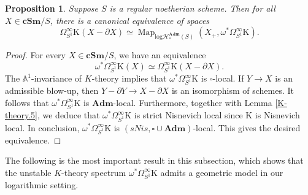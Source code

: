 \documentclass[11pt, a4paper]{amsart}
\newtheorem{prop}[thm]{Proposition}
\theoremstyle{definition}
\numberwithin{equation}{subsection}
\newcommand{\A}{\mathbb{A}}
\newcommand{\cSm}{\mathbf{cSm}}
\newcommand{\Adm}{\mathbf{Adm}}
\newcommand{\Kth}{\mathrm{K}}
\newcommand{\boxx}{\square}
\newcommand{\Map}{\operatorname{Map}}
\newcommand{\inflogHpt}{\mathrm{log}\mathcal{H}_\ast}
\begin{document}
\begin{prop}
\label{K-theory.18}
Suppose $S$ is a regular noetherian scheme.
Then for all $X\in \cSm/S$, there is a canonical equivalence of spaces
\[
\Omega_{S^1}^\infty \Kth(X-\partial X)
\simeq
\Map_{\inflogHpt^\Adm(S)}(X_+,\omega^*\Omega_{S^1}^\infty \Kth).
\]
\end{prop}
\begin{proof}
For every $X\in \cSm/S$, we have an equivalence
\[
\omega^*\Omega_{S^1}^\infty \Kth(X)
\simeq
\Omega_{S^1}^\infty \Kth(X-\partial X).
\]
The $\A^1$-invariance of $K$-theory implies that $\omega^*\Omega_{S^1}^\infty \Kth$ is $\boxx$-local.
If $Y\to X$ is an admissible blow-up, then $Y-\partial Y\to X-\partial X$ is an isomorphism of schemes.
It follows that $\omega^*\Omega_{S^1}^\infty \Kth$ is $\Adm$-local.
Furthermore, 
together with Lemma \ref{K-theory.5}, 
we deduce that $\omega^*\Omega_{S^1}^\infty \Kth$ is strict Nisnevich local since $\Kth$ is Nisnevich local.
In conclusion, $\omega^*\Omega_{S^1}^\infty \Kth$ is $(sNis,\boxx\cup \Adm)$-local.
This gives the desired equivalence.
\end{proof}

The following is the most important result in this subsection, 
which shows that the unstable $K$-theory spectrum $\omega^*\Omega_{S^1}^\infty \Kth$ admits a geometric model 
in our logarithmic setting.
\end{document}
